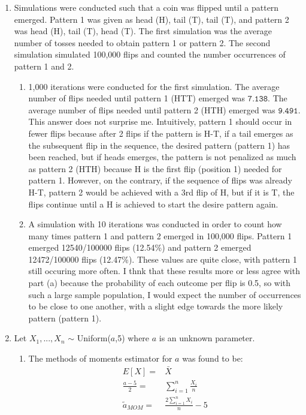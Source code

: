 \documentclass[letterpaper]{article}
\begin{document}
\begin{enumerate}
\item Simulations were conducted such that a coin was flipped until a pattern emerged. Pattern 1 was given as head (H), tail (T), tail (T), and pattern 2 was head (H), tail (T), head (T). The first simulation was the average number of tosses needed to obtain pattern 1 or pattern 2. The second simulation simulated 100,000 flips and counted the number occurrences of pattern 1 and 2.
\begin{enumerate}
\item 1,000 iterations were conducted for the first simulation. The average number of flips needed until pattern 1 (HTT) emerged was $\texttt{7.138}$. The average number of flips needed until pattern 2 (HTH) emerged was $\texttt{9.491}$. This answer does not surprise me. Intuitively, pattern 1 should occur in fewer flips because after 2 flips if the pattern is H-T,  if a tail emerges as the subsequent flip in the sequence, the desired pattern (pattern 1) has been reached, but if heads emerges, the pattern is not penalized as much as pattern 2 (HTH) because H is the first flip (position 1) needed for pattern 1. However, on the contrary, if the sequence of flips was already H-T, pattern 2 would be achieved with a 3rd flip of H, but if it is T, the flips continue until a H is achieved to start the desire pattern again.

\item A simulation with 10 iterations was conducted in order to count how many times pattern 1 and pattern 2 emerged in 100,000 flips. Pattern 1 emerged 12540/100000 flips (12.54\%) and pattern 2 emerged 12472/100000 flips (12.47\%). These values are quite close, with pattern 1 still occuring more often. I thnk that these results more or less agree with part (a) because the probability of each outcome per flip is 0.5, so with such a large sample population, I would expect the number of occurrences to be close to one another, with a slight edge towards the more likely pattern (pattern 1). 
\end{enumerate}
\item Let $X_{1},...,X_{n}$ $\sim$ Uniform($a$,5) where $a$ is an unknown parameter.
\begin{enumerate}
\item The methods of moments estimator for $a$ was found to be:
\begin{align*}
E[X] =& \bar{X}\\
\frac{a-5}{2} =& \sum^{n}_{i=1}{\frac{X_{i}}{n}}\\
\tilde{a}_{MOM} =& \frac{2\sum^{n}_{i=1}{X_{i}}}{n} - 5
\end{align*}


\end{enumerate}
\end{enumerate}
\end{document}
